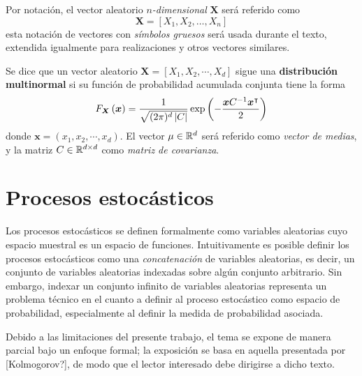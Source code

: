 Por notación, el vector aleatorio \textit{$n$-dimensional} $\boldsymbol{X}$ será referido como
\begin{equation}
\boldsymbol{X} = [X_1, X_2, \dots, X_n]
\end{equation}
esta notación de vectores con \textit{símbolos gruesos} será usada durante el texto, extendida igualmente para realizaciones y otros vectores similares.

\begin{ejemplo}
Se dice que un vector aleatorio $\boldsymbol{X} = [X_1, X_2, \cdots, X_d]$ sigue una \textbf{distribución multinormal} si su función de probabilidad acumulada conjunta tiene la forma
\begin{equation}
F_{\boldsymbol{X}}\left( \boldsymbol{x} \right) = \frac{1}{\sqrt{(2\pi)^{d}\left| C \right|}} \exp\left( -\frac{\boldsymbol{x} C^{-1} \boldsymbol{x}^{\intercal} }{2} \right)
\end{equation}
donde $\boldsymbol{x} = (x_1, x_2, \cdots, x_d)$. El vector $\mu \in \mathbb{R}^{d}$ será referido como \textit{vector de medias}, y la matriz $C \in \mathbb{R}^{d\times d}$ como \textit{matriz de covarianza}.
\end{ejemplo}



\section{Procesos estocásticos}

Los procesos estocásticos se definen formalmente como variables aleatorias cuyo espacio muestral es un espacio de funciones.
%
Intuitivamente es posible definir %
los procesos estocásticos como una \textit{concatenación} de variables aleatorias, es decir, un conjunto de variables aleatorias indexadas sobre algún conjunto arbitrario.
%
Sin embargo, indexar un conjunto infinito de variables aleatorias representa un problema técnico en el cuanto a definir al proceso estocástico como espacio de probabilidad, especialmente al definir la medida de probabilidad asociada.

Debido a las limitaciones del presente trabajo, el tema se expone de manera parcial bajo un enfoque formal; la exposición se basa en aquella presentada por [Kolmogorov?], de modo que el lector interesado debe dirigirse a dicho texto.

